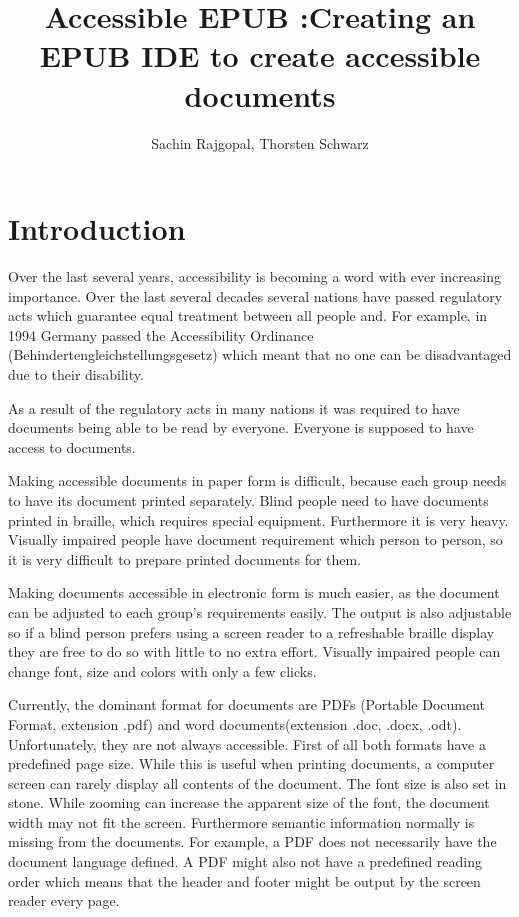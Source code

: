\documentclass{article}
\title{Accessible EPUB :Creating an EPUB IDE to create accessible documents}
\author{Sachin Rajgopal, Thorsten Schwarz}
\date{}
\begin{document}
\maketitle

\section{Introduction}
Over the last several years, accessibility is becoming a word with ever increasing importance. Over the last several decades several nations have passed regulatory acts which guarantee equal treatment between all people and. For example, in 1994 Germany passed the Accessibility Ordinance (Behindertengleichstellungsgesetz) which meant that no one can be disadvantaged due to their disability.

As a result of the regulatory acts in many nations it was required to have documents being able to be read by everyone. Everyone is supposed to have access to documents.

Making accessible documents in paper form is difficult, because each group needs to have its document printed separately. Blind people need to have documents printed in braille, which requires special equipment. Furthermore it is very heavy. Visually impaired people have document requirement which person to person, so it is very difficult to prepare printed documents for them.

Making documents accessible in electronic form is much easier, as the document can be adjusted to each group's requirements easily. The output is also adjustable so if a blind person prefers using a screen reader to a refreshable braille display they are free to do so with little to no extra effort. Visually impaired people can change font, size and colors with only a few clicks.

Currently, the dominant format for documents are PDFs (Portable Document Format, extension .pdf) and word documents(extension .doc, .docx, .odt). Unfortunately, they are not always accessible. First of all both formats have a predefined page size. While this is useful when printing documents, a computer screen can rarely display all contents of the document. The font size is also set in stone. While zooming can increase the apparent size of the font, the document width may not fit the screen. Furthermore semantic information normally is missing from the documents. For example, a PDF does not necessarily have the document language defined. A PDF might also not have a predefined reading order which means that the header and footer might be output by the screen reader every page. 
\end{document}
